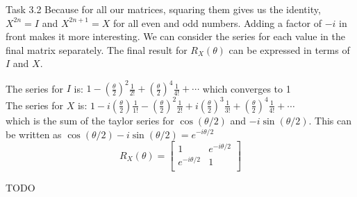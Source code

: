 \documentclass[aspectratio=169]{beamer}
\begin{document}
\begin{frame}[fragile]{Task 3.2}
Because for all our matrices, squaring them gives us the identity, $X^{2n} = I$ and $X^{2n+1} = X$ for all even and odd numbers.
Adding a factor of $-i$ in front makes it more interesting.
We can consider the series for each value in the final matrix separately. The final result for $R_X(\theta)$ can be expressed in terms of $I$ and $X$.

The series for $I$ is: $1 - \left(\frac{\theta}{2}\right)^2\frac{1}{2!} + \left(\frac{\theta}{2}\right)^4\frac{1}{4!} + \cdots$
which converges to 1 \\
The series for $X$ is: $1 - i\left(\frac{\theta}{2}\right)\frac{1}{1!} - \left(\frac{\theta}{2}\right)^2\frac{1}{2!} + i\left(\frac{\theta}{2}\right)^3\frac{1}{3!} + \left(\frac{\theta}{2}\right)^4\frac{1}{4!} + \cdots$ \\
which is the sum of the taylor series for $\cos(\theta/2)$ and $-i\sin(\theta/2)$.
This can be written as $\cos(\theta/2)-i\sin(\theta/2) = e^{-i \theta/2}$
\[ R_X(\theta) = \begin{bmatrix}
    1 & e^{-i \theta/2} \\
    e^{-i \theta/2} & 1 \\
\end{bmatrix} \]


TODO
\end{frame}
\end{document}
